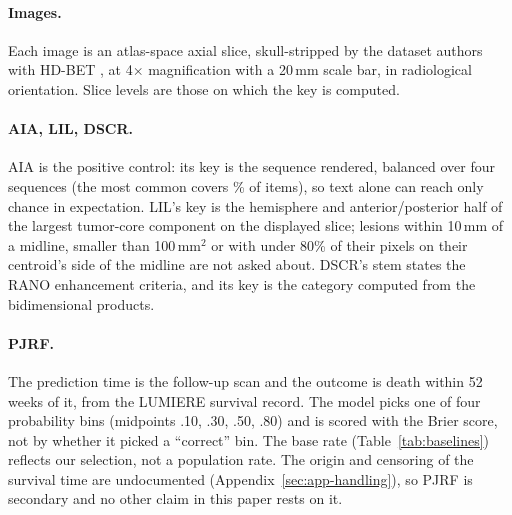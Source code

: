 \documentclass[11pt]{article}
\begin{document}
\paragraph{Images.} Each image is an atlas-space axial slice, skull-stripped by the dataset authors with HD-BET \citep{isensee2019automated}, at 4$\times$ magnification with a 20\,mm scale bar, in radiological orientation. Slice levels are those on which the key is computed.

\paragraph{AIA, LIL, DSCR.} AIA is the positive control: its key is the sequence rendered, balanced over four sequences (the most common covers \vfourMajorityAIA{}\% of items), so text alone can reach only chance in expectation. LIL's key is the hemisphere and anterior/posterior half of the largest tumor-core component on the displayed slice; lesions within 10\,mm of a midline, smaller than 100\,mm$^2$ or with under 80\% of their pixels on their centroid's side of the midline are not asked about. DSCR's stem states the RANO enhancement criteria, and its key is the category computed from the bidimensional products.

\paragraph{PJRF.} The prediction time is the follow-up scan and the outcome is death within 52 weeks of it, from the LUMIERE survival record. The model picks one of four probability bins (midpoints .10, .30, .50, .80) and is scored with the Brier score, not by whether it picked a ``correct'' bin. The base rate (Table~\ref{tab:baselines}) reflects our selection, not a population rate. The origin and censoring of the survival time are undocumented (Appendix~\ref{sec:app-handling}), so PJRF is secondary and no other claim in this paper rests on it.
\end{document}
